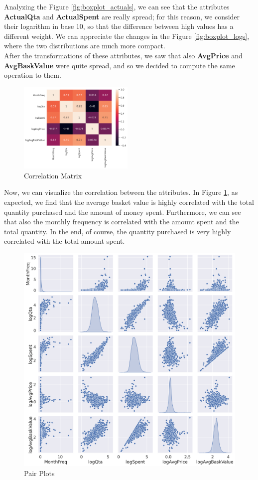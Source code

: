 Analyzing the Figure \ref{fig:boxplot_actuals}, we can see that the attributes \textbf{ActualQta} and \textbf{ActualSpent} are really spread; for this reason, we consider their logarithm in base 10, so that the difference between high values has a different weight. We can appreciate the changes in the Figure \ref{fig:boxplot_logs}, where the two distributions are much more compact.\\
After the transformations of these attributes, we saw that also \textbf{AvgPrice} and \textbf{AvgBaskValue} were quite spread, and so we decided to compute the same operation to them.

\begin{figure}
\centering
\includegraphics[width=0.49\textwidth]{img/corr_logs.png}
\caption{Correlation Matrix}
\label{fig:corr_logs}
\end{figure}

Now, we can visualize the correlation between the attributes. In Figure \ref{fig:corr_logs}, as expected, we find that the average basket value is highly correlated with the total quantity purchased and the amount of money spent. Furthermore, we can see that also the monthly frequency is correlated with the amount spent and the total quantity. In the end, of course, the quantity purchased is very highly correlated with the total amount spent.

\vspace{18mm}

\begin{figure}
\centering
\captionsetup{justification=centering}
\includegraphics[width=.49\textwidth]{img/pairplot.png}
\caption{Pair Plots}
\label{fig:pairplot}
\end{figure}

